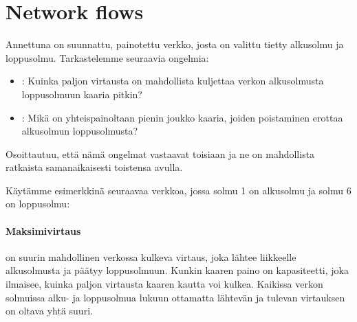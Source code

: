 \chapter{Network flows}

Annettuna on suunnattu, painotettu verkko,
josta on valittu tietty alkusolmu ja loppusolmu.
Tarkastelemme seuraavia ongelmia:

\begin{itemize}
\item {}:
Kuinka paljon virtausta on mahdollista kuljettaa
verkon alkusolmusta loppusolmuun kaaria pitkin?
\item {}:
Mikä on yhteispainoltaan pienin joukko kaaria,
joiden poistaminen erottaa alkusolmun loppusolmusta?
\end{itemize}

Osoittautuu, että nämä ongelmat vastaavat toisiaan
ja ne on mahdollista ratkaista samanaikaisesti
toistensa avulla.

Käytämme esimerkkinä seuraavaa verkkoa,
jossa solmu 1 on alkusolmu ja solmu 6 on loppusolmu:

\begin{center}
\end{center}

\subsubsection{Maksimivirtaus}


 on suurin
mahdollinen verkossa kulkeva virtaus,
joka lähtee liikkeelle alkusolmusta ja
päätyy loppusolmuun.
Kunkin kaaren paino on kapasiteetti,
joka ilmaisee, kuinka paljon virtausta kaaren
kautta voi kulkea.
Kaikissa verkon solmuissa alku-
ja loppusolmua lukuun ottamatta
lähtevän ja tulevan virtauksen on oltava yhtä suuri.

